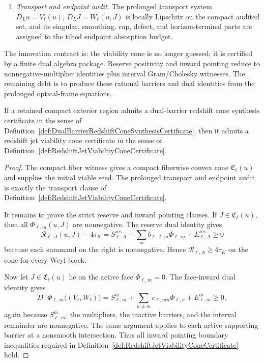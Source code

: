 \begin{definition}
\begin{enumerate}
    \item \emph{Transport and endpoint audit.}  The prolonged transport system
    $D_Lu=V_\ell(u)$, $D_LJ=W_\ell(u,J)$ is locally Lipschitz on the compact
    audited set, and its singular, smoothing, cap, defect, and
    horizon-terminal parts are assigned to the tilted endpoint absorption
    budget.
\end{enumerate}
The innovation contract is: the viability cone is no longer guessed; it is
certified by a finite dual algebra package.  Reserve positivity and inward
pointing reduce to nonnegative-multiplier identities plus interval
Gram/Cholesky witnesses.  The remaining debt is to produce these rational
barriers and dual identities from the prolonged optical-frame equations.
\end{definition}

\begin{theorem}\label{thm:DualBarrierSynthesisGivesViabilityCone}
If a retained compact exterior region admits a dual-barrier redshift cone
synthesis certificate in the sense of
Definition~\ref{def:DualBarrierRedshiftConeSynthesisCertificate}, then it
admits a redshift jet viability cone certificate in the sense of
Definition~\ref{def:RedshiftJetViabilityConeCertificate}.
\end{theorem}

\begin{proof}
The compact fiber witness gives a compact fiberwise convex cone
$\mathfrak C_\ell(u)$ and supplies the initial viable seed.  The prolonged
transport and endpoint audit is exactly the transport clause of
Definition~\ref{def:RedshiftJetViabilityConeCertificate}.

It remains to prove the strict reserve and inward pointing clauses.  If
$J\in\mathfrak C_\ell(u)$, then all $\Phi_{\ell,m}(u,J)$ are nonnegative.  The
reserve dual identity gives
\[
    \mathcal R_{\ell,A}(u,J)-4\tau_K
    =
    S_{\ell,A}^{\mathrm{res}}
    +
    \sum_m b_{\ell,A,m}\Phi_{\ell,m}
    +
    E_{\ell,A}^{\mathrm{res}}
    \ge0
\]
because each summand on the right is nonnegative.  Hence
$\mathcal R_{\ell,A}\ge4\tau_K$ on the cone for every Weyl block.

Now let $J\in\mathfrak C_\ell(u)$ lie on the active face
$\Phi_{\ell,m}=0$.  The face-inward dual identity gives
\[
    D^+\Phi_{\ell,m}\bigl((V_\ell,W_\ell)\bigr)
    =
    S_{\ell,m}^{\mathrm{in}}
    +
    \sum_{n\ne m}c_{\ell,mn}\Phi_{\ell,n}
    +
    E_{\ell,m}^{\mathrm{in}}
    \ge0,
\]
again because $S_{\ell,m}^{\mathrm{in}}$, the multipliers, the inactive
barriers, and the interval remainder are nonnegative.  The same argument
applies to each active supporting barrier at a nonsmooth intersection.  Thus
all inward pointing boundary inequalities required in
Definition~\ref{def:RedshiftJetViabilityConeCertificate} hold.
\end{proof}

